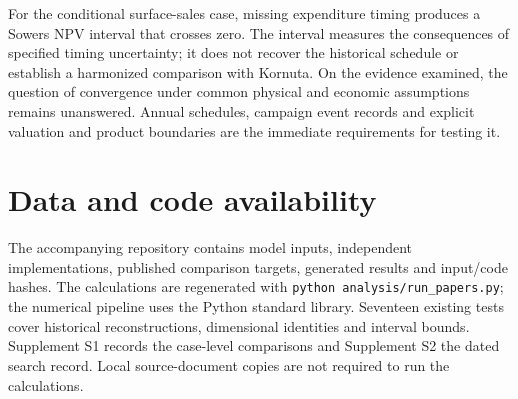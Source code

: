 \documentclass[final,5p,times,twocolumn]{elsarticle}
\begin{document}
For the conditional surface-sales case, missing expenditure timing produces a Sowers NPV interval that crosses zero. The interval measures the consequences of specified timing uncertainty; it does not recover the historical schedule or establish a harmonized comparison with Kornuta. On the evidence examined, the question of convergence under common physical and economic assumptions remains unanswered. Annual schedules, campaign event records and explicit valuation and product boundaries are the immediate requirements for testing it.

\section*{Data and code availability}
The accompanying repository contains model inputs, independent implementations, published comparison targets, generated results and input/code hashes. The calculations are regenerated with \texttt{python analysis/run\_papers.py}; the numerical pipeline uses the Python standard library. Seventeen existing tests cover historical reconstructions, dimensional identities and interval bounds. Supplement S1 records the case-level comparisons and Supplement S2 the dated search record. Local source-document copies are not required to run the calculations.
\end{document}

